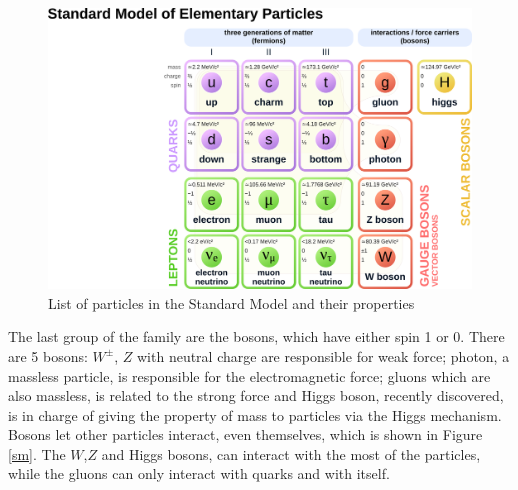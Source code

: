 \begin{center}
  \begin{figure}[ht]
    \centering
    \includegraphics[scale=0.3]{Chapter1/sm1.png}
    \caption[Standard Model to date]{List of particles in the Standard Model and their properties\cite{smtable}}
    \label{sm1}
  \end{figure}
\end{center}
The last group of the family are the bosons, which have either spin 1 or 0. 
There are 5 bosons: $W^{\pm}$, $Z$ with neutral charge are responsible for weak force; photon, a massless particle, is responsible for the electromagnetic force; gluons which are also massless, is related to the strong force and Higgs boson, recently discovered, is in charge of giving the property of mass to particles via the Higgs mechanism. Bosons let other particles interact, even themselves, which is shown in Figure \ref{sm}. 
The $W$,$Z$ and Higgs bosons, can interact with the most of the particles, while the gluons can only interact with quarks and with itself.
